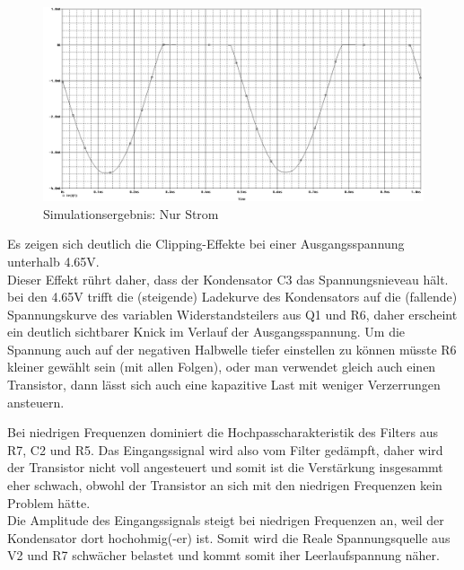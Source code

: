 \begin{figure}[H]
	\centering
	\includegraphics[width=\linewidth]{versuch5/spice/5222I.png}
	\caption{Simulationsergebnis: Nur Strom}
\end{figure}
Es zeigen sich deutlich die Clipping-Effekte bei einer Ausgangsspannung unterhalb 4.65V.\\
Dieser Effekt rührt daher, dass der Kondensator C3 das Spannungsnieveau hält. bei den 4.65V trifft die (steigende) Ladekurve des Kondensators auf die (fallende) Spannungskurve des variablen Widerstandsteilers aus Q1 und R6, daher erscheint ein deutlich sichtbarer Knick im Verlauf der Ausgangsspannung. Um die Spannung auch auf der negativen Halbwelle tiefer einstellen zu können müsste R6 kleiner gewählt sein (mit allen Folgen), oder man verwendet gleich auch einen Transistor, dann lässt sich auch eine kapazitive Last mit weniger Verzerrungen ansteuern.

Bei niedrigen Frequenzen dominiert die Hochpasscharakteristik des Filters aus R7, C2 und R5. Das Eingangssignal wird also vom Filter gedämpft, daher wird der Transistor nicht voll angesteuert und somit ist die Verstärkung insgesammt eher schwach, obwohl der Transistor an sich mit den niedrigen Frequenzen kein Problem hätte.\\
Die Amplitude des Eingangssignals steigt bei niedrigen Frequenzen an, weil der Kondensator dort hochohmig(-er) ist. Somit wird die Reale Spannungsquelle aus V2 und R7 schwächer belastet und kommt somit iher Leerlaufspannung näher.
